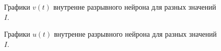 \begin{figure}[h]
	\caption{Графики $v(t)$ внутренне разрывного нейрона для разных значений $I$.}
	\label{ib_different_I_potentials}
\end{figure}

\begin{figure}[h]
	\caption{Графики $u(t)$ внутренне разрывного нейрона для разных значений $I$.}
	\label{ib_different_I_recovery}
\end{figure}

